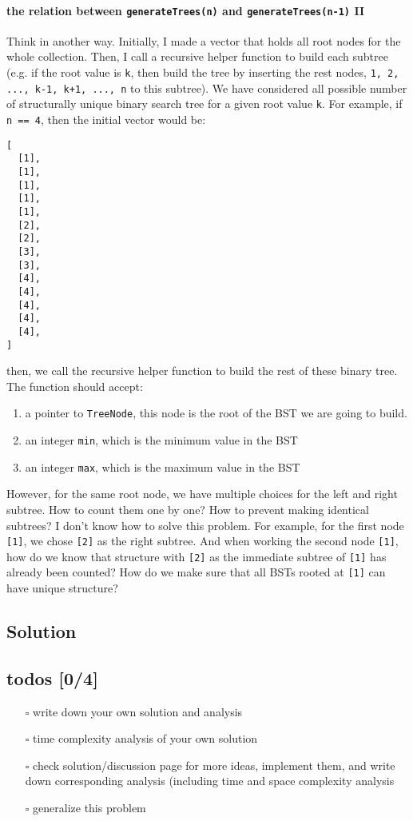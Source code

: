 \documentclass[11pt]{article}
\begin{document}
\paragraph{the relation between \texttt{generateTrees(n)} and \texttt{generateTrees(n-1)} II}
\label{sec:orge020a71}

Think in another way. Initially, I made a vector that holds all root nodes for the whole collection. Then, I call a recursive helper function to build each subtree (e.g. if the root value is \texttt{k}, then build the tree by inserting the rest nodes, \texttt{1, 2, ..., k-1, k+1, ..., n} to this subtree). We have considered all possible number of structurally unique binary search tree for a given root value \texttt{k}. For example, if \texttt{n == 4}, then the initial vector would be:
\begin{Verbatim}[frame=single]
[
  [1],
  [1],
  [1],
  [1],
  [1],
  [2],
  [2],
  [3],
  [3],
  [4],
  [4],
  [4],
  [4],
  [4],
]
\end{Verbatim}
then, we call the recursive helper function to build the rest of these binary tree. The function should accept:
\begin{enumerate}
\item a pointer to \texttt{TreeNode}, this node is the root of the BST we are going to build.
\item an integer \texttt{min}, which is the minimum value in the BST
\item an integer \texttt{max}, which is the maximum value in the BST
\end{enumerate}

However, for the same root node, we have multiple choices for the left and right subtree. How to count them one by one? How to prevent making identical subtrees? I don't know how to solve this problem. For example, for the first node \texttt{[1]}, we chose \texttt{[2]} as the right subtree. And when working the second node \texttt{[1]}, how do we know that structure with \texttt{[2]} as the immediate subtree of \texttt{[1]} has already been counted? How do we make sure that all BSTs rooted at \texttt{[1]} can have unique structure?
\subsection{Solution}
\label{sec:org321dcae}

\subsection{todos [0/4]}
\label{sec:org1ba63d6}
\begin{itemize}
\item[{$\square$}] write down your own solution and analysis
\item[{$\square$}] time complexity analysis of your own solution
\item[{$\square$}] check solution/discussion page for more ideas, implement them, and write down corresponding analysis (including time and space complexity analysis
\item[{$\square$}] generalize this problem
\end{itemize}
\end{document}
